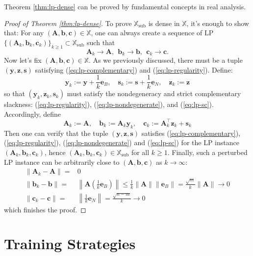 \documentclass{amsart} %
\def\eqref#1{equation~\ref{#1}}
\def\vb{{\bm{b}}}
\def\vc{{\bm{c}}}
\def\ve{{\bm{e}}}
\def\vs{{\bm{s}}}
\def\vy{{\bm{y}}}
\def\vz{{\bm{z}}}
\def\mA{{\bm{A}}}
\def\sX{{\mathbb{X}}}
\theoremstyle{definition}
\theoremstyle{remark}
\renewcommand{\eqref}[1]{\textup{(\ref{#1})}}
\begin{document}
Theorem \ref{thm:lp-dense} can be proved by fundamental concepts in real analysis.

\begin{proof}[Proof of Theorem \ref{thm:lp-dense}]
To prove $\sX_{\mathrm{sub}}$ is dense in $\sX$, it's enough to show that: For any $(\mA,\vb,\vc)\in\sX$, one can always create a sequence of LP $\{(\mA_k,\vb_k,\vc_k)\}_{k\ge 1} \subset \sX_{\mathrm{sub}}$ such that 
\[ \mA_k \to \mA, ~~ \vb_k \to \vb, ~~ \vc_k \to \vc. \]
Now let's fix $(\mA,\vb,\vc)\in\sX$. As we previously discussed, there must be a tuple $(\vy,\vz,\vs)$ satisfying \eqref{eq:lp-complementary} and \eqref{eq:lp-regularity}. Define:
\[ \vy_k := \vy + \frac{1}{k}\ve_{B},\quad \vs_{k} := \vs + \frac{1}{k}\ve_{N}, \quad \vz_k := \vz\]
so that $(\vy_k,\vz_k, \vs_k)$ must satisfy the nondegeneracy and strict complementary slackness: \eqref{eq:lp-regularity}, \eqref{eq:lp-nondegenerate}, and \eqref{eq:lp-sc}. Accordingly, define
\[ \mA_k := \mA, \quad \vb_k := \mA_k \vy_k, \quad \vc_k := \mA^\top_k \vz_k + \vs_k \]
Then one can verify that the tuple $(\vy,\vz,\vs)$ satisfies \eqref{eq:lp-complementary}, \eqref{eq:lp-regularity}, \eqref{eq:lp-nondegenerate} and \eqref{eq:lp-sc} for the LP instance $(\mA_k,\vb_k,\vc_k)$, hence $(\mA_k,\vb_k,\vc_k) \in \sX_{\mathrm{sub}}$ for all $k \geq 1$. Finally, such a perturbed LP instance can be arbitrarily close to $(\mA,\vb,\vc)$ as $k \to \infty$:
\begin{align*}
\|\mA_k-\mA\| = & 0 \\
\|\vb_k-\vb\| = & \left\| \mA\left( \frac{1}{k}\ve_{B} \right) \right\| \leq \frac{1}{k} \|\mA\| \|\ve_{B}\| = \frac{\sqrt{m}}{k}\|\mA\| \to 0 \\
\|\vc_k-\vc\| = & \left\|\frac{1}{k}\ve_{N} \right\| = \frac{\sqrt{n-m}}{k} \to 0
\end{align*}
which finishes the proof.
\end{proof}






\section{Training Strategies}
\label{app:training}
\end{document}
